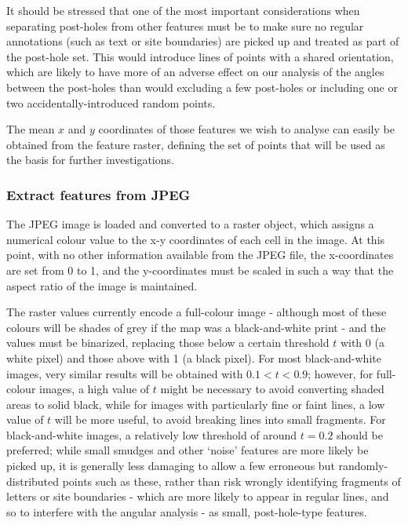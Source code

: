 \documentclass[../../ArchStats.tex]{subfiles}
\begin{document}
It should be stressed that one of the most important considerations when separating post-holes from other features must be to make sure no regular annotations (such as text or site boundaries) are picked up and treated as part of the post-hole set. This would introduce lines of points with a shared orientation, which are likely to have more of an adverse effect on our analysis of the angles between the post-holes than would excluding a few post-holes or including one or two accidentally-introduced random points. 


The mean $x$ and $y$ coordinates of those features we wish to analyse can easily be obtained from the feature raster, defining the set of points that will be used as the basis for further investigations.

\subsubsection{Extract features from JPEG}

The JPEG image is loaded and converted to a raster object, which assigns a numerical colour value to the x-y coordinates of each cell in the image. At this point, with no other information available from the JPEG file, the x-coordinates are set from 0 to 1, and the y-coordinates must be scaled in such a way that the aspect ratio of the image is maintained.

The raster values currently encode a full-colour image - although most of these colours will be shades of grey if the map was a black-and-white print - and the values must be binarized, replacing those below a certain threshold $t$ with 0 (a white pixel) and those above with 1 (a black pixel). For most black-and-white images, very similar results will be obtained with $0.1 < t < 0.9$; however, for full-colour images, a high value of $t$ might be necessary to avoid converting shaded areas to solid black, while for images with particularly fine or faint lines, a low value of $t$ will be more useful, to avoid  breaking lines into small fragments. For black-and-white images, a relatively low threshold of around $t = 0.2$ should be preferred; while small smudges and other `noise' features are more likely be picked up, it is generally less damaging  to allow a few erroneous but randomly-distributed points such as these, rather than risk wrongly identifying fragments of letters or site boundaries - which are more likely to appear in regular lines, and so to interfere with the angular analysis - as small, post-hole-type features.
\end{document}
